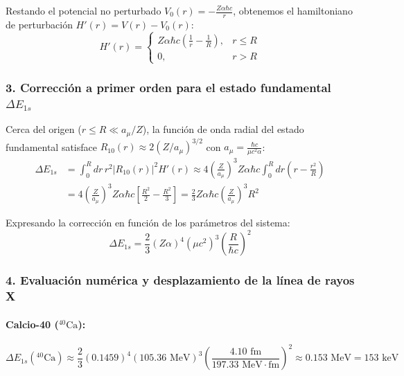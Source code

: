 \begin{problema}
Restando el potencial no perturbado $V_0(r) = -\frac{Z\alpha\hbar c}{r}$, obtenemos el hamiltoniano de perturbación $H'(r) = V(r) - V_0(r)$:
\begin{equation*}
H'(r) = 
\begin{cases}
Z\alpha\hbar c \left( \frac{1}{r} - \frac{1}{R} \right), & r \le R \\
0, & r > R
\end{cases}
\end{equation*}

\subsubsection*{3. Corrección a primer orden para el estado fundamental $\Delta E_{1s}$}

Cerca del origen ($r \le R \ll a_\mu/Z$), la función de onda radial del estado fundamental satisface $R_{10}(r) \approx 2 (Z/a_\mu)^{3/2}$ con $a_\mu = \frac{\hbar c}{\mu c^2 \alpha}$:
\begin{align*}
\Delta E_{1s} &= \int_0^R dr \, r^2 |R_{10}(r)|^2 H'(r) \approx 4 \left( \frac{Z}{a_\mu} \right)^3 Z\alpha\hbar c \int_0^R dr \left( r - \frac{r^2}{R} \right) \\
&= 4 \left( \frac{Z}{a_\mu} \right)^3 Z\alpha\hbar c \left[ \frac{R^2}{2} - \frac{R^2}{3} \right] = \frac{2}{3} Z\alpha\hbar c \left( \frac{Z}{a_\mu} \right)^3 R^2
\end{align*}

Expresando la corrección en función de los parámetros del sistema:
\begin{equation*}
\Delta E_{1s} = \frac{2}{3} (Z\alpha)^4 (\mu c^2)^3 \left( \frac{R}{\hbar c} \right)^2
\end{equation*}

\subsubsection*{4. Evaluación numérica y desplazamiento de la línea de rayos X}

\paragraph{Calcio-40 (${}^{40}\text{Ca}$):}
\begin{equation*}
\Delta E_{1s}({}^{40}\text{Ca}) \approx \frac{2}{3} (0.1459)^4 (105.36\text{ MeV})^3 \left( \frac{4.10\text{ fm}}{197.33\text{ MeV}\cdot\text{fm}} \right)^2 \approx 0.153\text{ MeV} = 153\text{ keV}
\end{equation*}


\end{problema}

